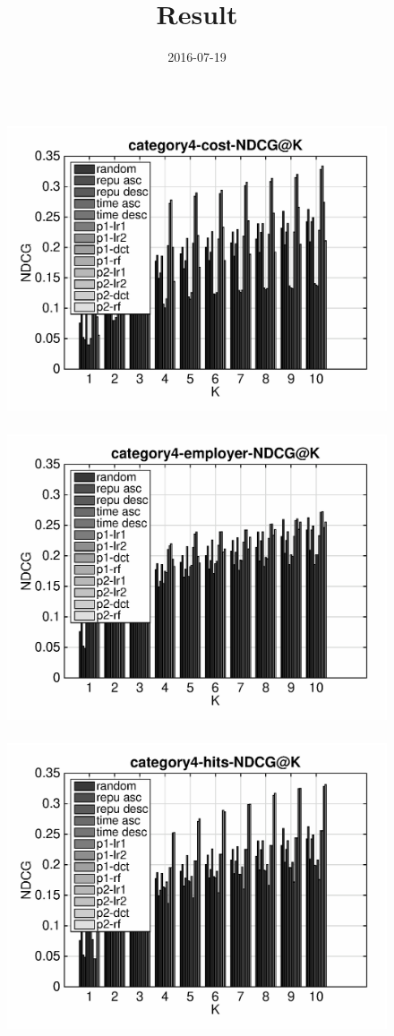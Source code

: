 \documentclass{article}
\title{Result}
\date{2016-07-19}
\begin{document}
  \maketitle
 \clearpage
\graphicspath{{./group2method/}}

\begin{figure}[ht]
\begin{flushleft}
\includegraphics[width=18cm,height=9cm]{category4-cost-NDCG@K.eps}
\includegraphics[width=18cm,height=9cm]{category4-employer-NDCG@K.eps}
\includegraphics[width=18cm,height=9cm]{category4-hits-NDCG@K.eps}
\end{flushleft}
\end{figure}
\end{document}
